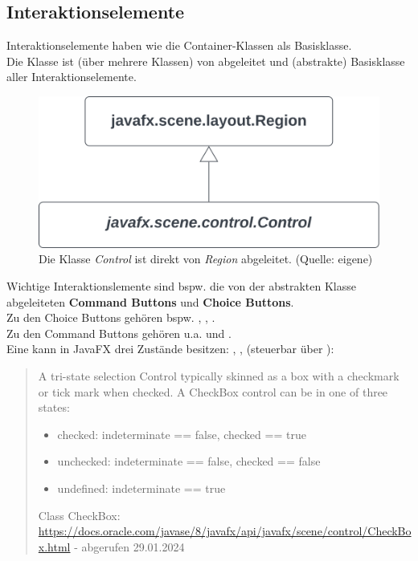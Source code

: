 \subsection{Interaktionselemente}

Interaktionselemente haben wie die Container-Klassen  als Basisklasse.\\

\noindent
Die Klasse  ist (über mehrere Klassen) von  abgeleitet und (abstrakte) Basisklasse aller Interaktionselemente.

\begin{figure}
    \centering
    \includegraphics[scale=0.5]{chapters/fopt3/img/javafx/control}
    \caption{Die Klasse \textit{Control} ist direkt von \textit{Region} abgeleitet. (Quelle: eigene)}
    \label{fig:control}
\end{figure}



\noindent
Wichtige Interaktionslemente sind bspw. die von der abstrakten Klasse  abgeleiteten \textbf{Command Buttons} und \textbf{Choice Buttons}.\\
Zu den Choice Buttons gehören bspw. , , .\\
Zu den Command Buttons gehören u.a.  und .\\

\noindent
Eine  kann in JavaFX drei Zustände besitzen: , ,  (steuerbar über ):

\blockquote[{Class CheckBox: \url{https://docs.oracle.com/javase/8/javafx/api/javafx/scene/control/CheckBox.html} - abgerufen 29.01.2024}]{
    A tri-state selection Control typically skinned as a box with a checkmark or tick mark when checked. A CheckBox control can be in one of three states:
    \begin{itemize}
        \item checked: indeterminate == false, checked == true
        \item unchecked: indeterminate == false, checked == false
        \item undefined: indeterminate == true
    \end{itemize}
}

